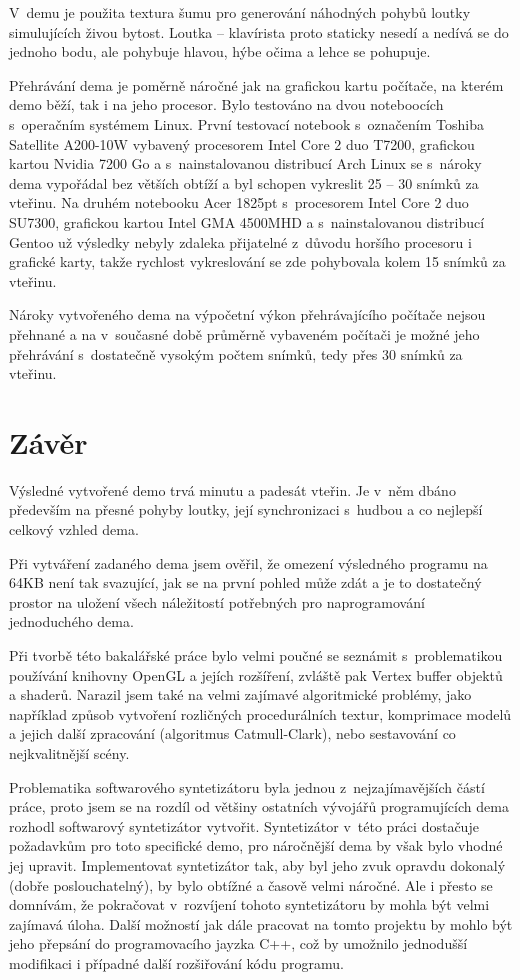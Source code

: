 V~demu je použita textura šumu pro generování náhodných pohybů loutky simulujících živou bytost.
Loutka -- klavírista proto staticky nesedí a nedívá se do jednoho bodu, ale pohybuje hlavou, hýbe očima a lehce se pohupuje.

Přehrávání dema je poměrně náročné jak na grafickou kartu počítače, na kterém demo běží, tak i na jeho procesor.
Bylo testováno na dvou noteboocích s~operačním systémem Linux.
První testovací notebook s~označením Toshiba Satellite A200-10W vybavený  procesorem Intel Core 2 duo T7200, grafickou kartou Nvidia 7200 Go a s~nainstalovanou distribucí Arch Linux se s~nároky dema vypořádal bez větších obtíží a byl schopen vykreslit 25 -- 30 snímků za vteřinu.
Na druhém notebooku Acer 1825pt s~procesorem Intel Core 2 duo SU7300, grafickou kartou Intel GMA 4500MHD a s~nainstalovanou distribucí Gentoo už výsledky nebyly zdaleka přijatelné z~důvodu horšího procesoru i grafické karty, takže rychlost vykreslování se zde pohybovala kolem 15 snímků za vteřinu.

Nároky vytvořeného dema na výpočetní výkon přehrávajícího počítače nejsou přehnané a na v~současné době průměrně vybaveném počítači je možné jeho přehrávání s~dostatečně vysokým počtem snímků, tedy přes 30 snímků za vteřinu.


\chapter{Závěr}
Výsledné vytvořené demo trvá minutu a padesát vteřin.
Je v~něm dbáno především na přesné pohyby loutky, její synchronizaci s~hudbou a co nejlepší celkový vzhled dema.  

Při vytváření zadaného dema jsem ověřil, že omezení výsledného programu na 64KB není tak svazující, jak se na první pohled může zdát a je to dostatečný prostor na uložení všech náležitostí potřebných pro naprogramování jednoduchého dema.

Při tvorbě této bakalářské práce bylo velmi poučné se seznámit s~problematikou používání knihovny OpenGL a jejích rozšíření, zvláště pak Vertex buffer objektů a shaderů.
Narazil jsem také na velmi zajímavé algoritmické problémy, jako například způsob vytvoření rozličných procedurálních textur, komprimace modelů a jejich další zpracování (algoritmus Catmull-Clark), nebo sestavování co nejkvalitnější scény.

Problematika softwarového syntetizátoru byla jednou z~nejzajímavějších částí práce, proto jsem se na rozdíl od většiny ostatních vývojářů programujících dema rozhodl softwarový syntetizátor vytvořit.
Syntetizátor v~této práci dostačuje požadavkům pro toto specifické demo, pro náročnější dema by však bylo vhodné jej upravit.
Implementovat syntetizátor tak, aby byl jeho zvuk opravdu dokonalý (dobře poslouchatelný), by bylo obtížné a časově velmi náročné.
Ale i přesto se domnívám, že pokračovat v~rozvíjení tohoto syntetizátoru by mohla být velmi zajímavá úloha.
Další možností jak dále pracovat na tomto projektu by mohlo být jeho přepsání do programovacího jayzka C++, což by umožnilo jednodušší modifikaci i případné další rozšiřování kódu programu.

